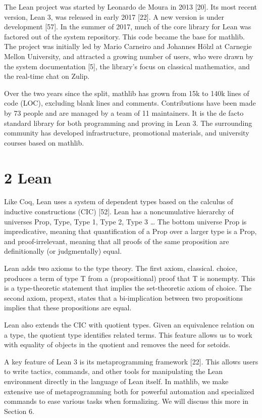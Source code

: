 \documentclass[
]{article}
\newcounter{none} %
\begin{document}
The Lean project was started by Leonardo de Moura in 2013 {[}20{]}. Its
most recent version, Lean 3, was released in early 2017 {[}22{]}. A new
version is under development {[}57{]}. In the summer of 2017, much of
the core library for Lean was factored out of the system repository.
This code became the base for mathlib. The project was initially led by
Mario Carneiro and Johannes Hölzl at Carnegie Mellon University, and
attracted a growing number of users, who were drawn by the system
documentation {[}5{]}, the library's focus on classical mathematics, and
the real-time chat on Zulip.

Over the two years since the split, mathlib has grown from 15k to 140k
lines of code (LOC), excluding blank lines and comments. Contributions
have been made by 73 people and are managed by a team of 11 maintainers.
It is the de facto standard library for both programming and proving in
Lean 3. The surrounding community has developed infrastructure,
promotional materials, and university courses based on mathlib.

\section{2 Lean}\label{lean}

Like Coq, Lean uses a system of dependent types based on the calculus of
inductive constructions (CIC) {[}52{]}. Lean has a noncumulative
hierarchy of universes Prop, Type, Type 1, Type 2, Type 3 \ldots{} The
bottom universe Prop is impredicative, meaning that quantification of a
Prop over a larger type is a Prop, and proof-irrelevant, meaning that
all proofs of the same proposition are definitionally (or judgmentally)
equal.

Lean adds two axioms to the type theory. The first axiom, classical.
choice, produces a term of type T from a (propositional) proof that T is
nonempty. This is a type-theoretic statement that implies the
set-theoretic axiom of choice. The second axiom, propext, states that a
bi-implication between two propositions implies that these propositions
are equal.

Lean also extends the CIC with quotient types. Given an equivalence
relation on a type, the quotient type identifies related terms. This
feature allows us to work with equality of objects in the quotient and
removes the need for setoids.

A key feature of Lean 3 is its metaprogramming framework {[}22{]}. This
allows users to write tactics, commands, and other tools for
manipulating the Lean environment directly in the language of Lean
itself. In mathlib, we make extensive use of metaprogramming both for
powerful automation and specialized commands to ease various tasks when
formalizing. We will discuss this more in Section 6.
\end{document}
